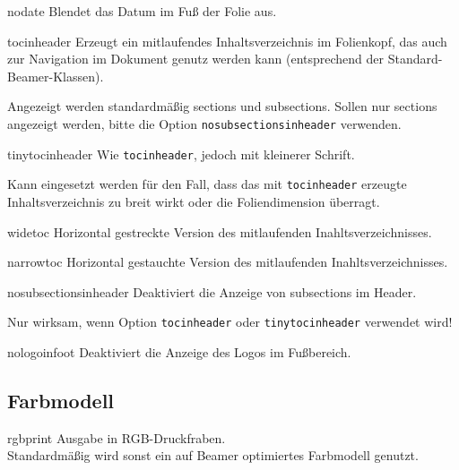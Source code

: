 \documentclass[cmyk,a4paper,colorscheme=green,TUBStitlepage=picture]{tubsreprt}
\begin{document}
\begin{classoption}{nodate}
  Blendet das Datum im Fuß der Folie aus.
\end{classoption}

\begin{classoption}{tocinheader}
  Erzeugt ein mitlaufendes Inhaltsverzeichnis im Folienkopf,
  das auch zur Navigation im Dokument genutz werden kann
  (entsprechend der Standard-Beamer-Klassen).
  
  Angezeigt werden standardmäßig sections und subsections.
  Sollen nur sections angezeigt werden, bitte die Option
  \lstinline{nosubsectionsinheader} verwenden.
  
\end{classoption}

\begin{classoption}{tinytocinheader}
  Wie \lstinline{tocinheader}, jedoch mit kleinerer Schrift.

  Kann eingesetzt werden für den Fall, dass das mit \lstinline{tocinheader}
  erzeugte Inhaltsverzeichnis zu breit wirkt oder die Foliendimension
  überragt.
\end{classoption}

\begin{classoption}{widetoc}
  Horizontal gestreckte Version des mitlaufenden Inahltsverzeichnisses.
\end{classoption}

\begin{classoption}{narrowtoc}
  Horizontal gestauchte Version des mitlaufenden Inahltsverzeichnisses.
\end{classoption}

\begin{classoption}{nosubsectionsinheader}
  Deaktiviert die Anzeige von subsections im Header.
  
  Nur wirksam, wenn Option \lstinline{tocinheader} oder
  \lstinline{tinytocinheader} verwendet wird!
\end{classoption}

\begin{classoption}{nologoinfoot}
  Deaktiviert die Anzeige des Logos im Fußbereich.
\end{classoption}

\subsection{Farbmodell}

\begin{classoption}{rgbprint}
  Ausgabe in RGB-Druckfraben.\\
  Standardmäßig wird sonst ein auf Beamer optimiertes Farbmodell genutzt.
\end{classoption}
\end{document}
